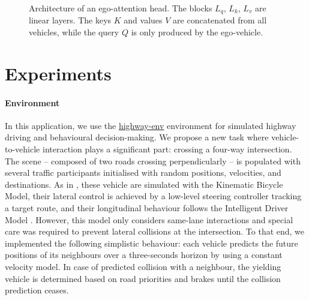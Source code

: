 \begin{figure}[tp]
	\caption{Architecture of an ego-attention head.
		The blocks $L_{q}$, $L_{k}$, $L_{v}$ are linear layers. The keys $K$ and values $V$ are concatenated from all vehicles, while the query $Q$ is only produced by the ego-vehicle.}
	\label{fig:ego-attention}
\end{figure}


\section{Experiments}
\paragraph{Environment}

In this application, we use the \href{https://github.com/eleurent/highway-env}{highway-env} environment \citep{highway-env} for simulated highway driving and behavioural decision-making. We propose a new task where vehicle-to-vehicle interaction plays a significant part: crossing a four-way intersection.
The scene -- composed of two roads crossing perpendicularly -- is populated with several traffic participants initialised with random positions, velocities, and destinations. As in \citep{highway-env}, these vehicle are simulated with the Kinematic Bicycle Model, their lateral control is achieved by a low-level steering controller tracking a target route, and their longitudinal behaviour follows the Intelligent Driver Model \citep{Treiber2000}. However, this model only considers same-lane interactions and special care was required to prevent lateral collisions at the intersection. To that end, we implemented the following simplistic behaviour: each vehicle predicts the future positions of its neighbours over a three-seconds horizon by using a constant velocity model. In case of predicted collision with a neighbour, the yielding vehicle is determined based on road priorities and brakes until the collision prediction ceases. 

